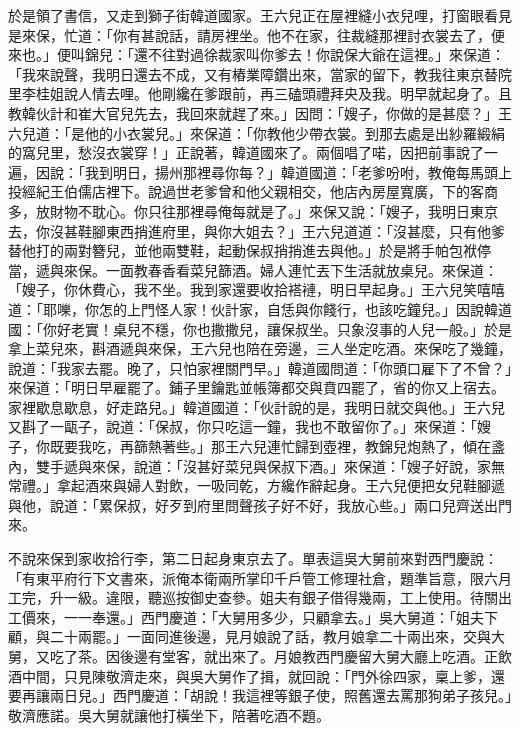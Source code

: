 於是領了書信，又走到獅子街韓道國家。王六兒正在屋裡縫小衣兒哩，打窗眼看見是來保，忙道：「你有甚說話，請房裡坐。他不在家，往裁縫那裡討衣裳去了，便來也。」便叫錦兒：「還不往對過徐裁家叫你爹去！你說保大爺在這裡。」來保道：「我來說聲，我明日還去不成，又有樁業障鑽出來，當家的留下，教我往東京替院里李桂姐說人情去哩。他剛纔在爹跟前，再三磕頭禮拜央及我。明早就起身了。且教韓伙計和崔大官兒先去，我回來就趕了來。」因問：「嫂子，你做的是甚麼？」王六兒道：「是他的小衣裳兒。」來保道：「你教他少帶衣裳。到那去處是出紗羅緞絹的窩兒里，愁沒衣裳穿！」正說著，韓道國來了。兩個唱了喏，因把前事說了一遍，因說：「我到明日，揚州那裡尋你每？」韓道國道：「老爹吩咐，教俺每馬頭上投經紀王伯儒店裡下。說過世老爹曾和他父親相交，他店內房屋寬廣，下的客商多，放財物不耽心。你只往那裡尋俺每就是了。」來保又說：「嫂子，我明日東京去，你沒甚鞋腳東西捎進府里，與你大姐去？」王六兒道道：「沒甚麼，只有他爹替他打的兩對簪兒，並他兩雙鞋，起動保叔捎捎進去與他。」於是將手帕包袱停當，遞與來保。一面教春香看菜兒篩酒。婦人連忙丟下生活就放桌兒。來保道：「嫂子，你休費心，我不坐。我到家還要收拾褡褳，明日早起身。」王六兒笑嘻嘻道：「耶嚛，你怎的上門怪人家！伙計家，自恁與你餞行，也該吃鐘兒。」因說韓道國：「你好老實！桌兒不穩，你也撒撒兒，讓保叔坐。只象沒事的人兒一般。」於是拿上菜兒來，斟酒遞與來保，王六兒也陪在旁邊，三人坐定吃酒。來保吃了幾鐘，說道：「我家去罷。晚了，只怕家裡關門早。」韓道國問道：「你頭口雇下了不曾？」來保道：「明日早雇罷了。鋪子里鑰匙並帳簿都交與賁四罷了，省的你又上宿去。家裡歇息歇息，好走路兒。」韓道國道：「伙計說的是，我明日就交與他。」王六兒又斟了一甌子，說道：「保叔，你只吃這一鐘，我也不敢留你了。」來保道：「嫂子，你既要我吃，再篩熱著些。」那王六兒連忙歸到壺裡，教錦兒炮熱了，傾在盞內，雙手遞與來保，說道：「沒甚好菜兒與保叔下酒。」來保道：「嫂子好說，家無常禮。」拿起酒來與婦人對飲，一吸同乾，方纔作辭起身。王六兒便把女兒鞋腳遞與他，說道：「累保叔，好歹到府里問聲孩子好不好，我放心些。」兩口兒齊送出門來。

不說來保到家收拾行李，第二日起身東京去了。單表這吳大舅前來對西門慶說：「有東平府行下文書來，派俺本衛兩所掌印千戶管工修理社倉，題準旨意，限六月工完，升一級。違限，聽巡按御史查參。姐夫有銀子借得幾兩，工上使用。待關出工價來，一一奉還。」西門慶道：「大舅用多少，只顧拿去。」吳大舅道：「姐夫下顧，與二十兩罷。」一面同進後邊，見月娘說了話，教月娘拿二十兩出來，交與大舅，又吃了茶。因後邊有堂客，就出來了。月娘教西門慶留大舅大廳上吃酒。正飲酒中間，只見陳敬濟走來，與吳大舅作了揖，就回說：「門外徐四家，稟上爹，還要再讓兩日兒。」西門慶道：「胡說！我這裡等銀子使，照舊還去罵那狗弟子孩兒。」敬濟應諾。吳大舅就讓他打橫坐下，陪著吃酒不題。

